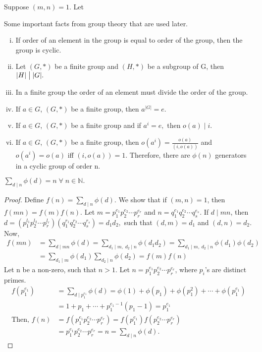 \documentclass[10pt,a4paper]{article}
\begin{document}
\newpage

\begin{theorem}
Suppose $(m,n)=1$. Let
\end{theorem}

\begin{theorem}
Some important facts from group theory that are used later.
\begin{enumerate}[i)]
\item If order of an element in the group is equal to order of the group, then the group is cyclic.
\item Let $(G,*)$ be a finite group and $(H,*)$ be a subgroup of G, then $|H|\bigm\vert|G|.$
\item In a  finite group the order of an element must divide the order of the group.
\item If $a\in G$, $(G,*)$ be a finite group, then $a^{|G|}=e.$
\item If $a\in G$, $(G,*)$ be a finite group and if $a^i=e,$ then $o(a)\mid i.$
\item If $a\in G$, $(G,*)$ be a finite group, then $o(a^i)=\frac{o(a)}{(i,o(a))}$ and $o(a^i)=o(a)$ iff $(i,o(a))=1.$ Therefore, there are $\phi(n)$ generators in a cyclic group of order n.
\end{enumerate}
\end{theorem}

\begin{lemma}
$\sum_{d\mid n}\phi(d)=n\;\forall\;n\in\mathbb{N}.$
\end{lemma}

\begin{proof}
Define $f(n)=\sum_{d\mid n}\phi(d)$. We show that if $(m,n)=1$, then $f(mn)=f(m)f(n).$ Let $m=p^{e_1}_1p^{e_2}_2\cdots p^{e_r}_r$ and $n=q^{e_1}_1q^{e_2}_2\cdots q^{e_s}_s$. If $d\mid mn$, then $d=(p^{l_1}_1p^{l_2}_2\cdots p^{l_r}_r)(q^{r_1}_1q^{r_2}_2\cdots q^{r_s}_s)=d_1d_2,$ such that $(d,m)=d_1$ and $(d,n)=d_2.$
Now,
\begin{align*}
f(mn)&=\sum_{d\mid mn}\phi(d) = \sum_{d_1\mid m,\;d_2\mid n}\phi(d_1d_2)= \sum_{d_1\mid m,\;d_2\mid n}\phi(d_1)\phi(d_2)\\
&=\sum_{d_1\mid m}\phi(d_1)\sum_{d_2\mid n}\phi(d_2)=f(m)f(n)
\end{align*}
Let n be a non-zero, such that $n>1$. Let $n=p^{e_1}_1p^{e_2}_2\cdots p^{e_r}_r$, where $p_i$'s are distinct primes.
\begin{align*}
f(p^{e_1}_1) &= \sum_{d\mid p^{e_1}_1}\phi(d) = \phi(1) + \phi(p_1) + \phi(p^2_1) + \cdots + \phi(p^{e_1}_1) \\
&= 1+p_1+\cdots+p^{e_1-1}_1(p_1-1) = p^{e_1}_1 \\
\text{Then, }f(n) &= f(p^{e_1}_1p^{e_2}_2\cdots p^{e_r}_r) = f(p^{e_1}_1)f(p^{e_2}_2\cdots p^{e_r}_r) \\
&= p^{e_1}_1p^{e_2}_2\cdots p^{e_r}_r = n = \sum_{d\mid n}\phi(d).
\end{align*}
\end{proof}
\end{document}
